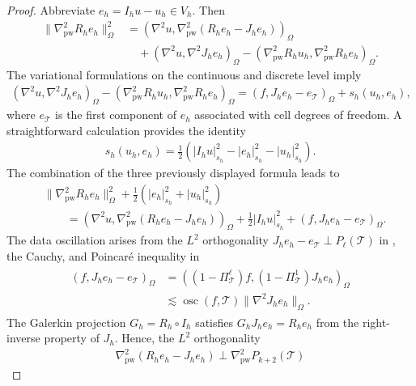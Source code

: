 \documentclass[a4paper]{amsart}
\numberwithin{equation}{section}
\def\T{\mathcal{T}}
\def\pw{\mathrm{pw}}
\theoremstyle{definition}
\theoremstyle{remark}
\numberwithin{theorem}{section}
\numberwithin{equation}{section}
\numberwithin{table}{section}
\numberwithin{figure}{section}
\begin{document}
\begin{proof}
    Abbreviate $e_h = I_h u - u_h \in V_h$. Then
    \begin{align*}
         \|\nabla_\pw^2 R_h e_h\|_\Omega^2 &= (\nabla^2 u,\nabla^2_\pw (R_h e_h - J_h e_h))_\Omega\\
         &\quad+ (\nabla^2 u,\nabla^2 J_h e_h)_\Omega - (\nabla^2_\pw R_h u_h,\nabla^2_\pw R_h e_h)_\Omega.
    \end{align*}
    The variational formulations on the continuous and discrete level imply
    \begin{align*}
        (\nabla^2 u,\nabla^2 J_h e_h)_\Omega - (\nabla^2_\pw R_h u_h,\nabla^2_\pw R_h e_h)_\Omega = (f, J_h e_h - e_\T)_\Omega + s_h(u_h,e_h),
    \end{align*}
    where $e_\T$ is the first component of $e_h$ associated with cell degrees of freedom.
    A straightforward calculation provides the identity
    \begin{align*}
        s_h(u_h,e_h) = \frac{1}{2}(|I_h u|_{s_h}^2 - |e_h|^2_{s_h} - |u_h|^2_{s_h}).
    \end{align*}
    The combination of the three previously displayed formula leads to
    \begin{align}\label{ineq:proof_a_priori}
        &\|\nabla_\pw^2 R_h e_h\|_\Omega^2 + \frac{1}{2}(|e_h|^2_{s_h} + |u_h|^2_{s_h}) \nonumber\\
        &\qquad = (\nabla^2 u,\nabla^2_\mathrm{pw} (R_h e_h - J_h e_h))_\Omega + \frac{1}{2}|I_h u|_{s_h}^2 + (f, J_h e_h - e_\T)_\Omega.
    \end{align}
    The data oscillation arises from the $L^2$ orthogonality $J_h e_h - e_\T \perp P_{\ell}(\T)$ in , the Cauchy, and Poincar\'e inequality in
    \begin{align}\label{ineq:osc}
        \begin{aligned}
        	(f, J_h e_h - e_\T)_\Omega
        	&= ((1-\Pi^{\ell}_\T)f,(1 - \Pi_\T^1)J_h e_h)_\Omega\\
        	&\lesssim \operatorname{osc}(f,\mathcal{T})\|\nabla^2 J_h e_h\|_\Omega.
        \end{aligned}
    \end{align}
    The Galerkin projection $G_h = R_h \circ I_h$ satisfies
    $G_h J_h e_h = R_h e_h$ from the right-inverse property of $J_h$. Hence, the $L^2$ orthogonality
    \begin{align}\label{eq:orth-R-J}
    	\nabla^2_\mathrm{pw} (R_h e_h - J_h e_h) \perp \nabla^2_\mathrm{pw} P_{k+2}(\mathcal{T})

\end{align}
\end{proof}
\end{document}
